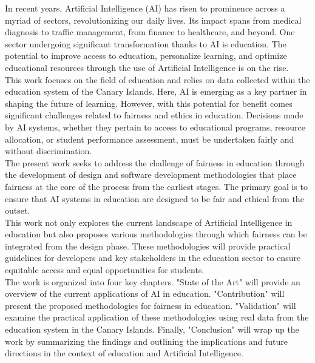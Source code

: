 In recent years, Artificial Intelligence (AI) has risen to prominence across a myriad of sectors, revolutionizing our daily lives. Its impact spans from medical diagnosis to traffic management, from finance to healthcare, and beyond. One sector undergoing significant transformation thanks to AI is education. The potential to improve access to education, personalize learning, and optimize educational resources through the use of Artificial Intelligence is on the rise.\\
This work focuses on the field of education and relies on data collected within the education system of the Canary Islands. Here, AI is emerging as a key partner in shaping the future of learning. However, with this potential for benefit comes significant challenges related to fairness and ethics in education. Decisions made by AI systems, whether they pertain to access to educational programs, resource allocation, or student performance assessment, must be undertaken fairly and without discrimination.\\
The present work seeks to address the challenge of fairness in education through the development of design and software development methodologies that place fairness at the core of the process from the earliest stages. The primary goal is to ensure that AI systems in education are designed to be fair and ethical from the outset. \\
This work not only explores the current landscape of Artificial Intelligence in education but also proposes various methodologies through which fairness can be integrated from the design phase. These methodologies will provide practical guidelines for developers and key stakeholders in the education sector to ensure equitable access and equal opportunities for students.\\
The work is organized into four key chapters. "State of the Art" will provide an overview of the current applications of AI in education. "Contribution" will present the proposed methodologies for fairness in education. "Validation" will examine the practical application of these methodologies using real data from the education system in the Canary Islands. Finally, "Conclusion" will wrap up the work by summarizing the findings and outlining the implications and future directions in the context of education and Artificial Intelligence.
